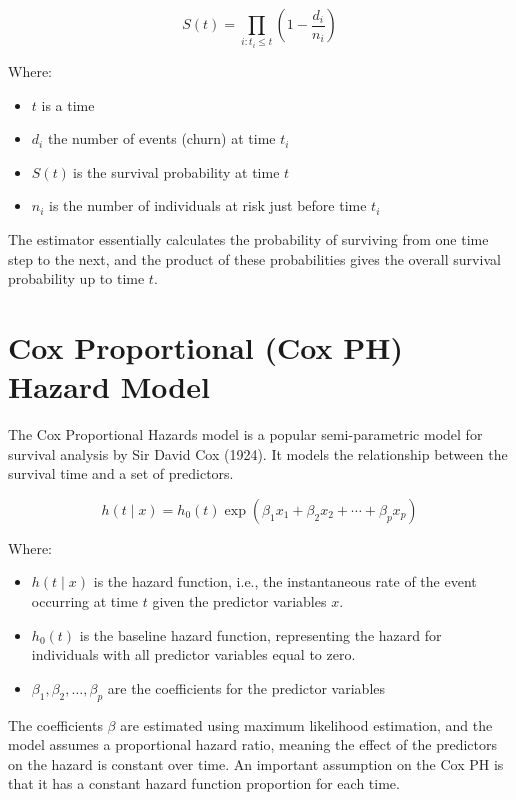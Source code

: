 \documentclass[doublespacing]{report} %
\begin{document}
\[S\left(t\right)=\prod_{i:t_i\le t}\left(1-\frac{d_i}{n_i}\right)\]

Where:
 \begin{itemize}
     \item \(t\) is a time
     \item \(d_i \) the number of events (churn) at time \(t_i\)
     \item \(S\left(t\right)\ \)is the survival probability at time \(t\)
     \item \(n_i\) is the number of individuals at risk just before time \(t_i\)
 \end{itemize}
The estimator essentially calculates the probability of surviving from one time step to the next, and the product of these probabilities gives the overall survival probability up to time \(t\).

\section{Cox Proportional (Cox PH) Hazard Model}

The Cox Proportional Hazards model is a popular semi-parametric model for survival analysis by Sir David Cox (1924). It models the relationship between the survival time and a set of predictors.

\[
h\left(t \mid x\right) = h_0(t) \exp(\beta_1 x_1 + \beta_2 x_2 + \cdots + \beta_p x_p)
\]

Where:
 \begin{itemize}
     \item \(h(t\mid x)\) is the hazard function, i.e., the instantaneous rate of the event occurring at time \(t\) given the predictor variables \(x\).
     \item \(h_0\left(t\right)\) is the baseline hazard function, representing the hazard for individuals with all predictor variables equal to zero.
     \item \(\beta_1,\beta_2,\ldots,\beta_p\) are the coefficients for the predictor variables
 \end{itemize}

 The coefficients \(\beta\) are estimated using maximum likelihood estimation, and the model assumes a proportional hazard ratio, meaning the effect of the predictors on the hazard is constant over time.
An important assumption on the Cox PH is that it has a constant hazard function proportion for each time.


%
%
\end{document}

